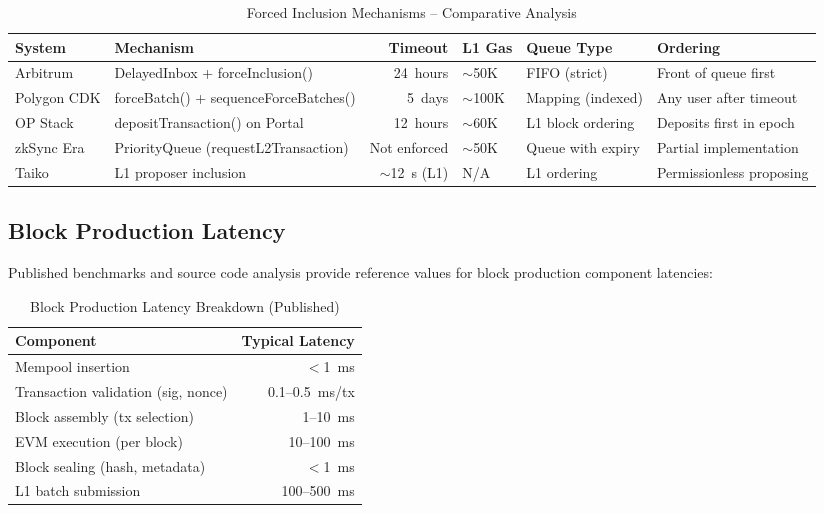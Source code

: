 \begin{table}[htbp]
\caption{Forced Inclusion Mechanisms -- Comparative Analysis}
\label{tab:forced-inclusion-comparison}
\centering
\begin{tabular}{llrlll}
\toprule
\textbf{System} & \textbf{Mechanism} & \textbf{Timeout} & \textbf{L1 Gas} & \textbf{Queue Type} & \textbf{Ordering} \\
\midrule
Arbitrum & DelayedInbox + forceInclusion() & 24~hours & ${\sim}$50K & FIFO (strict) & Front of queue first \\
Polygon CDK & forceBatch() + sequenceForceBatches() & 5~days & ${\sim}$100K & Mapping (indexed) & Any user after timeout \\
OP Stack & depositTransaction() on Portal & 12~hours & ${\sim}$60K & L1 block ordering & Deposits first in epoch \\
zkSync Era & PriorityQueue (requestL2Transaction) & Not enforced & ${\sim}$50K & Queue with expiry & Partial implementation \\
Taiko & L1 proposer inclusion & ${\sim}$12~s (L1) & N/A & L1 ordering & Permissionless proposing \\
\bottomrule
\end{tabular}
\end{table}

\subsection{Block Production Latency}

Published benchmarks and source code analysis provide reference values for block
production component latencies:

\begin{table}[htbp]
\caption{Block Production Latency Breakdown (Published)}
\label{tab:latency-breakdown}
\centering
\begin{tabular}{lr}
\toprule
\textbf{Component} & \textbf{Typical Latency} \\
\midrule
Mempool insertion & $<$1~ms \\
Transaction validation (sig, nonce) & 0.1--0.5~ms/tx \\
Block assembly (tx selection) & 1--10~ms \\
EVM execution (per block) & 10--100~ms \\
Block sealing (hash, metadata) & $<$1~ms \\
L1 batch submission & 100--500~ms \\
\bottomrule
\end{tabular}
\end{table}


